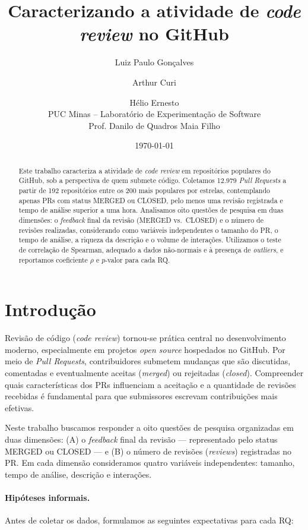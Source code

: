 \documentclass[11pt,a4paper]{article}
\title{Caracterizando a atividade de \emph{code review} no GitHub}
\author{Luiz Paulo Gon\c{c}alves \and Arthur Curi \and H\'elio Ernesto \\
PUC Minas -- Laborat\'orio de Experimenta\c{c}\~ao de Software \\
Prof. Danilo de Quadros Maia Filho}
\date{\today}
\begin{document}
\maketitle

\begin{abstract}
Este trabalho caracteriza a atividade de \emph{code review} em reposit\'orios populares do GitHub,
sob a perspectiva de quem submete c\'odigo. Coletamos 12.979 \emph{Pull Requests} a partir de
192 reposit\'orios entre os 200 mais populares por estrelas, contemplando apenas PRs com
status MERGED ou CLOSED, pelo menos uma revis\~ao registrada e tempo de an\'alise superior a uma hora.
Analisamos oito quest\~oes de pesquisa em duas dimens\~oes: o \emph{feedback} final da revis\~ao
(MERGED vs.\ CLOSED) e o n\'umero de revis\~oes realizadas, considerando como vari\'aveis
independentes o tamanho do PR, o tempo de an\'alise, a riqueza da descri\c{c}\~ao e o volume de
intera\c{c}\~oes. Utilizamos o teste de correla\c{c}\~ao de Spearman, adequado a dados
n\~ao-normais e \`a presen\c{c}a de \emph{outliers}, e reportamos coeficiente $\rho$ e
$p$-valor para cada RQ.
\end{abstract}

\section{Introdu\c{c}\~ao}

Revis\~ao de c\'odigo (\emph{code review}) tornou-se pr\'atica central no desenvolvimento
moderno, especialmente em projetos \emph{open source} hospedados no GitHub. Por meio de
\emph{Pull Requests}, contribuidores submetem mudan\c{c}as que s\~ao discutidas, comentadas e
eventualmente aceitas (\emph{merged}) ou rejeitadas (\emph{closed}). Compreender quais
caracter\'isticas dos PRs influenciam a aceita\c{c}\~ao e a quantidade de revis\~oes recebidas
\'e fundamental para que submissores escrevam contribui\c{c}\~oes mais efetivas.

Neste trabalho buscamos responder a oito quest\~oes de pesquisa organizadas em duas dimens\~oes:
(A) o \emph{feedback} final da revis\~ao --- representado pelo status MERGED ou CLOSED --- e
(B) o n\'umero de revis\~oes (\emph{reviews}) registradas no PR. Em cada dimens\~ao consideramos
quatro vari\'aveis independentes: tamanho, tempo de an\'alise, descri\c{c}\~ao e intera\c{c}\~oes.

\paragraph{Hip\'oteses informais.}
Antes de coletar os dados, formulamos as seguintes expectativas para cada RQ:
\end{document}
